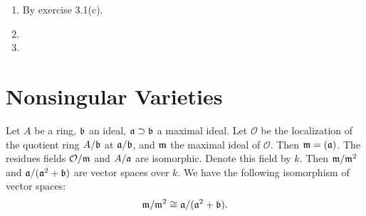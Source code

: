\documentclass{note}
\begin{document}
\begin{enumerate}
\item By exercise 3.1(c).
\item
\item
\end{enumerate}

\section{Nonsingular Varieties}
\begin{proposition*}
  Let $A$ be a ring, $\mathfrak{b}$ an ideal,
  $\mathfrak{a} \supset \mathfrak{b}$ a maximal ideal. Let $\mathcal{O}$ be
  the localization of the quotient ring $A/\mathfrak{b}$ at
  $\mathfrak{a}/\mathfrak{b}$, and $\mathfrak{m}$ the maximal ideal of
  $\mathcal{O}$. Then $\mathfrak{m} = (\mathfrak{a})$. The residues fields
  $\mathcal{O}/\mathfrak{m}$ and $A/\mathfrak{a}$ are isomorphic. Denote
  this field by $k$. Then $\mathfrak{m}/\mathfrak{m}^2$ and
  $\mathfrak{a}/(\mathfrak{a}^2+\mathfrak{b})$ are vector spaces over $k$. We
  have the following isomorphism of vector spaces:
  \begin{equation*}
    \mathfrak{m}/\mathfrak{m}^2 \cong \mathfrak{a}/(\mathfrak{a}^2+\mathfrak{b}).
  \end{equation*}
\end{proposition*}
\end{document}

